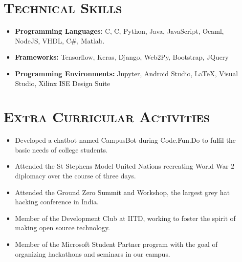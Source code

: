 \documentclass{article}
\newenvironment{longversion}{}{} %
\newcommand{\CPP}
{C\nolinebreak[4]\hspace{-.05em}\raisebox{.22ex}{\footnotesize\bf ++}}
\newcommand{\tmpsection}[1]{}
\let\tmpsection=\section
\renewcommand{\section}[1]{\tmpsection*{\textsc{#1}}}
\begin{document}
\begin{longversion}
\section{Technical Skills}\begin{itemize}
\item \textbf{Programming Languages:}  C, \CPP, Python, Java, JavaScript, Ocaml, NodeJS, VHDL, C\#, Matlab.
\item \textbf{Frameworks:} Tensorflow, Keras, Django, Web2Py, Bootstrap, JQuery

\item \textbf{Programming Environments:} Jupyter, Android Studio, LaTeX, Visual Studio, Xilinx ISE Design Suite

\end{itemize}

\end{longversion}

\section{Extra Curricular Activities}


\begin{itemize}
    \setlength\itemsep{0em}
    
    \item Developed a chatbot named CampusBot during Code.Fun.Do to fulfil the basic needs of college students.
    \item Attended the St Stephens Model United Nations recreating World War 2 diplomacy over the course of three days.
    \item Attended the Ground Zero Summit and Workshop, the largest grey hat hacking conference in India.
    \item Member of the Development Club at IITD, working to foster the spirit of making open source technology.
    \item Member of the Microsoft Student Partner program with the goal of organizing hackathons and seminars in our campus. 
     
\end{itemize}
\end{document}

